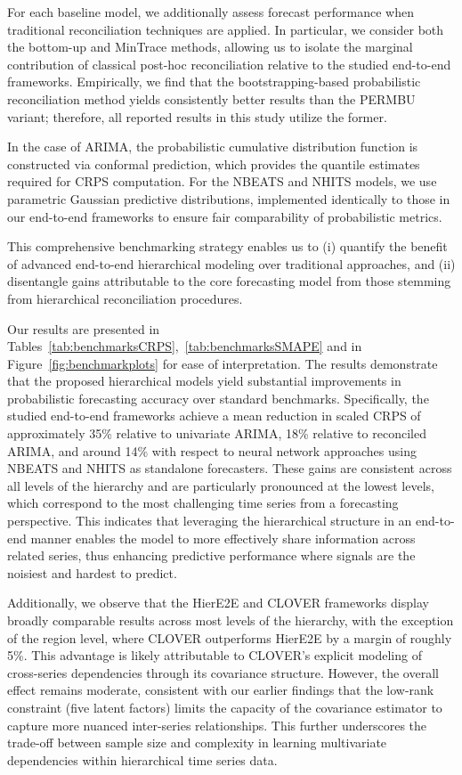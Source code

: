 \documentclass[letterpaper]{article}
\begin{document}
For each baseline model, we additionally assess forecast performance when traditional reconciliation techniques are applied. In particular, we consider both the bottom-up and MinTrace methods, allowing us to isolate the marginal contribution of classical post-hoc reconciliation relative to the studied end-to-end frameworks. Empirically, we find that the bootstrapping-based probabilistic reconciliation method yields consistently better results than the PERMBU variant; therefore, all reported results in this study utilize the former.

In the case of ARIMA, the probabilistic cumulative distribution function is constructed via conformal prediction, which provides the quantile estimates required for CRPS computation. For the NBEATS and NHITS models, we use parametric Gaussian predictive distributions, implemented identically to those in our end-to-end frameworks to ensure fair comparability of probabilistic metrics.

This comprehensive benchmarking strategy enables us to (i) quantify the benefit of advanced end-to-end hierarchical modeling over traditional approaches, and (ii) disentangle gains attributable to the core forecasting model from those stemming from hierarchical reconciliation procedures.

Our results are presented in Tables~\ref{tab:benchmarksCRPS},~\ref{tab:benchmarksSMAPE} and in Figure~\ref{fig:benchmarkplots} for ease of interpretation. The results demonstrate that the proposed hierarchical models yield substantial improvements in probabilistic forecasting accuracy over standard benchmarks. Specifically, the studied end-to-end frameworks achieve a mean reduction in scaled CRPS of approximately 35\% relative to univariate ARIMA, 18\% relative to reconciled ARIMA, and around 14\% with respect to neural network approaches using NBEATS and NHITS as standalone forecasters. These gains are consistent across all levels of the hierarchy and are particularly pronounced at the lowest levels, which correspond to the most challenging time series from a forecasting perspective. This indicates that leveraging the hierarchical structure in an end-to-end manner enables the model to more effectively share information across related series, thus enhancing predictive performance where signals are the noisiest and hardest to predict.

Additionally, we observe that the HierE2E and CLOVER frameworks display broadly comparable results across most levels of the hierarchy, with the exception of the region level, where CLOVER outperforms HierE2E by a margin of roughly 5\%. This advantage is likely attributable to CLOVER’s explicit modeling of cross-series dependencies through its covariance structure. However, the overall effect remains moderate, consistent with our earlier findings that the low-rank constraint (five latent factors) limits the capacity of the covariance estimator to capture more nuanced inter-series relationships. This further underscores the trade-off between sample size and complexity in learning multivariate dependencies within hierarchical time series data.
\end{document}
